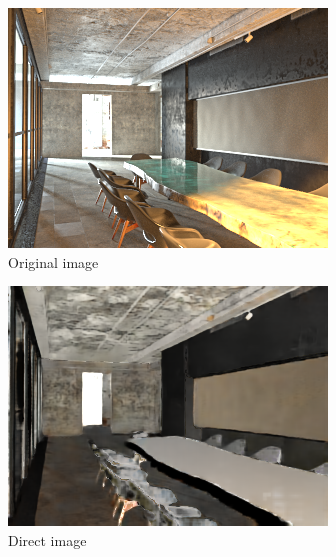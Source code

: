 \begin{figure}[H]
    \centering
    \begin{subfigure}{0.32\linewidth}
        \includegraphics[width=\linewidth]{praca/images/AI47_007_Cam07.VRayLightSelect_RE_L8.png}
        \caption{Original image}
    \end{subfigure}
    \begin{subfigure}{0.32\linewidth}
        \includegraphics[width=\linewidth]{praca/images/AI47_007_Cam07.VRayLightSelect_RE_L8.direct.png}
        \caption{Direct image}
    \end{subfigure}
    \begin{subfigure}{0.32\linewidth}

\end{subfigure}
\end{figure}
